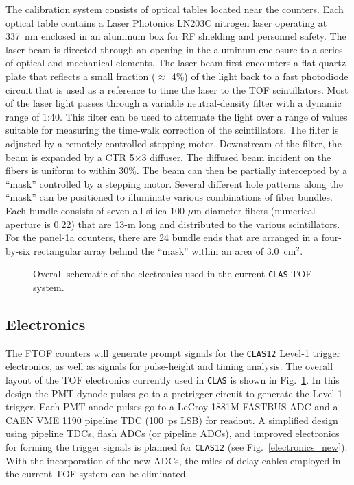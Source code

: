 The calibration system consists of optical tables located near the 
counters.  Each optical table contains a Laser Photonics LN203C nitrogen 
laser operating at 337~nm enclosed in an aluminum box for RF shielding 
and personnel safety.  The laser beam is directed through an opening in 
the aluminum enclosure to a series of optical and mechanical elements.  
The laser beam first encounters a flat quartz plate that reflects a small 
fraction ($\approx$ 4\%) of the light back to a fast photodiode circuit
that is used as a reference to time the laser to the TOF scintillators.
Most of the laser light passes through a variable neutral-density filter 
with a dynamic range of 1:40.  This filter can be used to attenuate the 
light over a range of values suitable for measuring the time-walk correction 
of the scintillators.  The filter is adjusted by a remotely controlled 
stepping motor.  Downstream of the filter, the beam is expanded by a 
CTR 5$\times$3 diffuser.  The diffused beam incident on the fibers is 
uniform to within 30\%.  The beam can then be partially intercepted by a 
``mask'' controlled by a stepping motor.  Several different hole patterns 
along the ``mask'' can be positioned to illuminate various combinations of 
fiber bundles.  Each bundle consists of seven all-silica 100-$\mu$m-diameter 
fibers (numerical aperture is 0.22) that are 13-m long and distributed to 
the various scintillators.  For the panel-1a counters, there are 24 bundle 
ends that are arranged in a four-by-six rectangular array behind the ``mask'' 
within an area of 3.0~cm$^2$.

\begin{figure}[htbp]
\vspace{9.5cm}
\caption{\small{Overall schematic of the electronics used in the current
{\tt CLAS} TOF system.}}
\label{electronics_old}
\end{figure}

\subsection{Electronics}

The FTOF counters will generate prompt signals for the {\tt CLAS12} 
Level-1 trigger electronics, as well as signals for pulse-height and 
timing analysis.  The overall layout of the TOF electronics currently used 
in {\tt CLAS} is shown in Fig.~\ref{electronics_old}.  In this design the 
PMT dynode pulses go to a pretrigger circuit to generate the Level-1 trigger.
Each PMT anode pulses go to a LeCroy 1881M FASTBUS ADC and a CAEN VME 1190 
pipeline TDC (100~ps LSB) for readout.  A simplified design using pipeline 
TDCs, flash ADCs (or pipeline ADCs), and improved electronics for forming 
the trigger signals is planned for {\tt CLAS12} (see 
Fig.~\ref{electronics_new}).  With the incorporation of the new ADCs, the 
miles of delay cables employed in the current TOF system can be eliminated.

